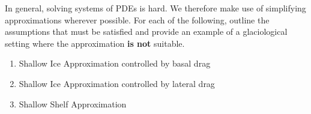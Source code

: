 \documentclass[12pt]{article}
\newenvironment{problem}[2][Problem]{\begin{trivlist}
\item[\hskip \labelsep {\bfseries #1}\hskip \labelsep {\bfseries #2.}]}{\end{trivlist}}
\begin{document}
\begin{problem}{3}
[3 pts] In general, solving systems of PDEs is hard.  We therefore make use of simplifying approximations wherever possible.  For each of the following, outline the assumptions that must be satisfied and provide an example of a glaciological setting where the approximation \textbf{is not} suitable.
\renewcommand{\labelenumi}{(\alph{enumi})}
\begin{enumerate}[itemsep=2pt]
    \item Shallow Ice Approximation controlled by basal drag
    \item Shallow Ice Approximation controlled by lateral drag
    \item Shallow Shelf Approximation
\end{enumerate}

\end{problem}
\end{document}

